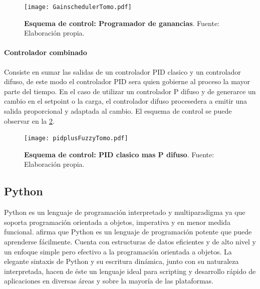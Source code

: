                 \begin{figure}[htb]
                    \centering
                    \texttt{[image: GainschedulerTomo.pdf]}
                    \caption[Esquema de control: Programador de ganancias]{\textbf{Esquema de control: Programador de ganancias}. Fuente: Elaboración propia.} 
                    \label{fig:GainschedulerTomo}
                \end{figure}
            
            \paragraph{Controlador combinado}
                
                Consiste en sumar las salidas de un controlador PID clasico y un controlador difuso, de este modo el controlador PID sera quien gobierne al proceso la mayor parte del tiempo. En el caso de utilizar un controlador P difuso y de generarce un cambio en el setpoint o la carga, el controlador difuso procesedera a emitir una salida proporcional y adaptada al cambio. El esquema de control se puede observar en la \cref{fig:pidplusFuzzyTomo}.
            
                \begin{figure}[htb]
                    \centering
                    \texttt{[image: pidplusFuzzyTomo.pdf]}
                    \caption[Esquema de control: PID clasico mas P difuso]{\textbf{Esquema de control: PID clasico mas P difuso}. Fuente: Elaboración propia.} 
                    \label{fig:pidplusFuzzyTomo}
                \end{figure}

    \subsection{Python}
        
        Python es un lenguaje de programación interpretado y multiparadigma ya que soporta programación orientada a objetos, imperativa y en menor medida funcional. \textcite{guido2017tutorial} afirma que Python es un lenguaje de programación potente que puede aprenderse fácilmente. Cuenta con estructuras de datos eficientes y de alto
        nivel y un enfoque simple pero efectivo a la programación orientada a objetos. La elegante sintaxis de Python y su escritura
        dinámica, junto con su naturaleza interpretada, hacen de éste un lenguaje ideal para scripting y desarrollo rápido de
        aplicaciones en diversas áreas y sobre la mayoría de las plataformas.
        
